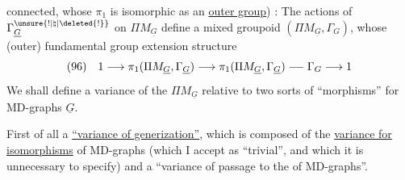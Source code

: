 connected, whose $\pi_1$ is isomorphic as an \uline{outer group}) :
The actions of $\Gamma^{\unsure{!|\natural|\deleted{!}}}_{\underline G}$ on $\Pi M_{\underline G}$ define a mixed groupoid $(\Pi M_{\underline G},\Gamma_G)$, whose (outer) fundamental group    extension structure
\[
(96)\quad1\longrightarrow\pi_1(\Pi M_{\underline G},\Gamma_{\underline G})\longrightarrow\pi_1(\Pi M_{\underline G},\Gamma_{\underline G})\relbar\joinrel\relbar\Gamma_G\longrightarrow1
\]
We shall define a  variance of the $\Pi M_{\underline G}$ relative to two sorts of ``morphisms'' for MD-graphs $\underline G$. 

First of all a \uline{``variance of generization''}, which is composed of the \uline{variance for isomorphisms} of MD-graphs (which I accept as ``trivial'', and which it is unnecessary to specify) and a ``variance of passage to the  of MD-graphs''.
